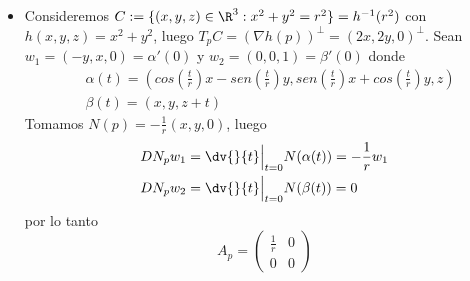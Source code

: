 \documentclass{article}
\begin{document}
\begin{itemize}
    \item Consideremos $C:=\{(x,y,z)\in\R^{3}:x^{2}+y^{2}=r^{2}\}=h^{-1}(r^{2})$ con 
    $h(x,y,z)=x^{2}+y^{2}$, luego $T_{p}C=(\nabla h(p))^{\perp}=(2x,2y,0)^{\perp}$. Sean $w_{1}=
    (-y,x,0)=\alpha'(0)$ y $w_{2}=(0,0,1)=\beta'(0)$ donde
    \begin{align*}
        & \alpha(t)=\left(cos\left(\frac{t}{r}\right)x-sen\left(\frac{t}{r}\right)y,
        sen\left(\frac{t}{r}\right)x+cos\left(\frac{t}{r}\right)y,z\right) \\
        & \beta(t)=(x,y,z+t)
    \end{align*}
    Tomamos $N(p)=-\frac{1}{r}(x,y,0)$, luego
    \begin{align*}
        & DN_{p}w_{1}=\dv{}{t}\Big|_{t=0}N(\alpha(t))=-\frac{1}{r}w_{1} \\
        & DN_{p}w_{2}=\dv{}{t}\Big|_{t=0}N(\beta(t))=0
    \end{align*}
    por lo tanto
    \begin{equation*}
        A_{p}=\begin{pmatrix}
            \frac{1}{r} & 0 \\
            0 & 0
        \end{pmatrix}
    \end{equation*}
\end{itemize}
\end{document}
